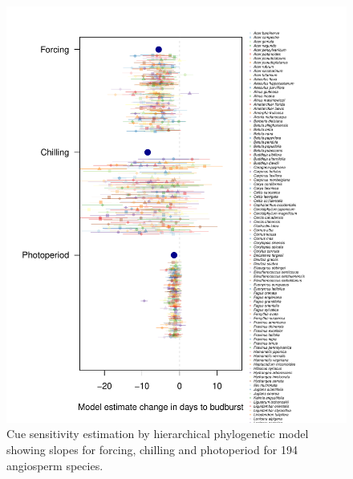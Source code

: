 \documentclass{article}\usepackage[]{graphicx}\usepackage[]{color}
\begin{document}
\begin{figure} [H]
  \begin{center}
  \includegraphics[width=14cm]{..//..//analyses/phylogeny/figures/muplot_angiosperm.pdf}
  \caption{Cue sensitivity estimation by hierarchical phylogenetic model showing slopes for forcing, chilling and photoperiod for 194 angiosperm species.}
  \label{fig:muplot_angio}
  \end{center}
\end{figure}
\end{document}
